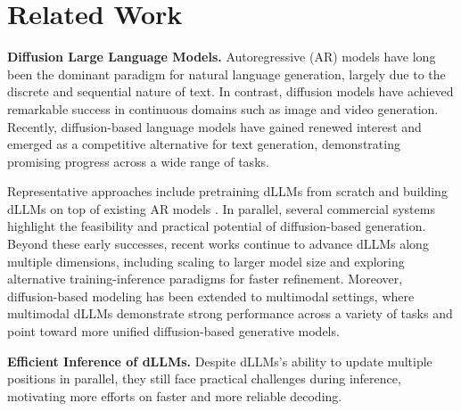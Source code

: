 \section{Related Work}
\noindent \textbf{Diffusion Large Language Models.}
Autoregressive (AR) models have long been the dominant paradigm for natural language generation, largely due to the discrete and sequential nature of text. In contrast, diffusion models have achieved remarkable success in continuous domains such as image and video generation. Recently, diffusion-based language models have gained renewed interest and emerged as a competitive alternative for text generation, demonstrating promising progress across a wide range of tasks.

Representative approaches include pretraining dLLMs from scratch \cite{llada} and building dLLMs on top of existing AR models \cite{dream}. In parallel, several commercial systems \cite{seeddiffusion, mercury, gemini_diffusion} highlight the feasibility and practical potential of diffusion-based generation. Beyond these early successes, recent works \cite{fastdllmv2, llada2.0, wedlm} continue to advance dLLMs along multiple dimensions, including scaling to larger model size and exploring alternative training-inference paradigms for faster refinement. Moreover, diffusion-based modeling has been extended to multimodal settings, where multimodal dLLMs \cite{llada-v, mmada} demonstrate strong performance across a variety of tasks and point toward more unified diffusion-based generative models.

\noindent \textbf{Efficient Inference of dLLMs.}
Despite dLLMs's ability to update multiple positions in parallel, they still face practical challenges during inference, motivating more efforts on faster and more reliable decoding. 

